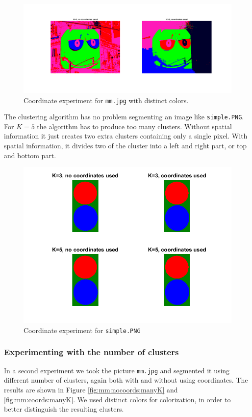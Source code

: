 \begin{figure}[h!]
\centering
\includegraphics[width = 0.9\linewidth]{figures/task2/mm_bad_visibility.png}
\caption{Coordinate experiment for \texttt{mm.jpg} with distinct colors.}
\label{fig:mm:coords:distinct}
\end{figure}

The clustering algorithm has no problem segmenting an image like \texttt{simple.PNG}. For $K=5$ the algorithm has to produce too many clusters. Without spatial information it just creates two extra clusters containing only a single pixel. With spatial information, it divides two of the cluster into a left and right part, or top and bottom part.

\begin{figure}[h!]
\centering
\includegraphics[width = 0.7\linewidth]{figures/task2/simple_coordinates.png}
\caption{Coordinate experiment for \texttt{simple.PNG}}
\label{fig:simple:coords}
\end{figure}

\subsubsection{Experimenting with the number of clusters}
In a second experiment we took the picture \texttt{mm.jpg} and segmented it using different number of clusters, again both with and without using coordinates. The results are shown in Figure \ref{fig:mm:nocoords:manyK} and \ref{fig:mm:coords:manyK}. We used distinct colors for colorization, in order to better distinguish the resulting clusters.


